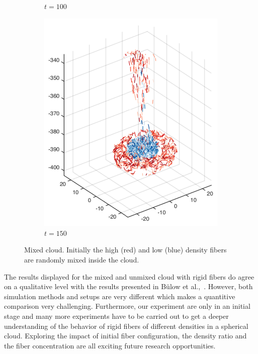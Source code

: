 \begin{figure}[htbp]
\begin{subfigure}[h]{0.24\textwidth}
    \caption{$t=100$}\label{fig:mixing_random_c}
  \end{subfigure}
  \begin{subfigure}[h]{0.24\textwidth}
    \centering
    \includegraphics[width=\textwidth]{img/mixing/random_00150.pdf}
    \caption{$t=150$}\label{fig:mixing_random_d}
  \end{subfigure}
  \caption[Mixed cloud.]{Mixed cloud. Initially the high (red) and low (blue) density fibers are randomly mixed inside the cloud.}
  \label{fig:mixed_sphere}
\end{figure}

The results displayed for the mixed and unmixed cloud with rigid fibers do agree on a qualitative level with the results presented in Bülow et al.,~\cite{Bulow2015}. However, both simulation methods and setups are very different which makes a quantitive comparison very challenging. Furthermore, our experiment are only in an initial stage and many more experiments have to be carried out to get a deeper understanding of the behavior of rigid fibers of different densities in a spherical cloud. Exploring the impact of initial fiber configuration, the density ratio and the fiber concentration are all exciting future research opportunities.
